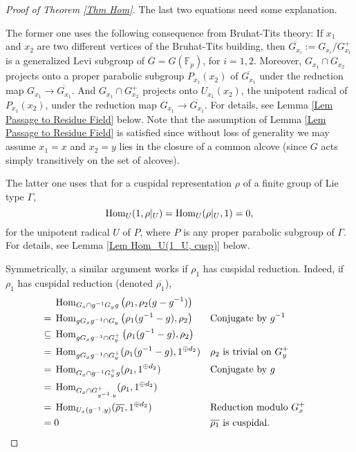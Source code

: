 \begin{proof}[Proof of Theorem \ref{Thm Hom}]
		The last two equations need some explanation. 
		
		The former one uses the following consequence from Bruhat-Tits theory: If $x_1$ and $x_2$ are two different vertices of the Bruhat-Tits building, then $\overline{G_{x_i}}:=G_{x_i}/G_{x_i}^+$ is a generalized Levi subgroup of $\overline{G}=G(\mathbb{F}_p)$, for $i=1, 2$. Moreover, $G_{x_1} \cap G_{x_2}$ projects onto a proper parabolic subgroup $P_{x_1}(x_2)$ of $\overline{G_{x_1}}$ under the reduction map $G_{x_1} \to \overline{G_{x_1}}$. And $G_{x_1} \cap G_{x_2}^+$ projects onto $U_{x_1}(x_2)$, the unipotent radical of $P_{x_1}(x_2)$, under the reduction map $G_{x_1} \to \overline{G_{x_1}}$. For details, see Lemma \ref{Lem Passage to Residue Field} below. Note that the assumption of Lemma \ref{Lem Passage to Residue Field} is satisfied since without loss of generality we may assume $x_1=x$ and $x_2=y$ lies in the closure of a common alcove (since $G$ acts simply transitively on the set of alcoves).
		
		The latter one uses that for a cuspidal representation $\rho$ of a finite group of Lie type $\Gamma$, 
		$$\operatorname{\operatorname{Hom}}_U(1, \rho|_U)=\operatorname{\operatorname{Hom}}_U(\rho|_U, 1)=0,$$
		for the unipotent radical $U$ of $P$, where $P$ is any proper parabolic subgroup of $\Gamma$. For details, see Lemma \ref{Lem Hom_U(1_U, cusp)} below.
		
		Symmetrically, a similar argument works if $\rho_1$ has cuspidal reduction. Indeed, if $\rho_1$ has cuspidal reduction (denoted $\overline{\rho_1}$),
		\begin{align*}    	
			& \Hom_{G_x \cap g^{-1}G_yg}\left(\rho_1, \rho_2(g-g^{-1})\right) \\
			=\;& \Hom_{gG_xg^{-1} \cap G_y}\left(\rho_1(g^{-1}-g), \rho_2\right) && \text{Conjugate by $g^{-1}$}\\ 
			\subseteq\;& \Hom_{gG_xg^{-1} \cap G_y^+}\left(\rho_1(g^{-1}-g), \rho_2\right) && %
			\\
			=\;& \Hom_{gG_xg^{-1} \cap G_y^+}(\rho_1(g^{-1}-g), 1^{\oplus d_2}) && \text{$\rho_2$ is trivial on $G_y^+$ }\\
			=\;& \Hom_{G_x \cap g^{-1}G_y^+g}(\rho_1, 1^{\oplus d_2}) && \text{Conjugate by $g$}\\
			=\;& \Hom_{G_x \cap G_{g^{-1}.y}^+}(\rho_1, 1^{\oplus d_2}) && \\
			=\;& \Hom_{U_x(g^{-1}.y)}(\overline{\rho_1}, 1^{\oplus d_2}) && \text{Reduction modulo $G_x^+$}\\
			=\;& 0 && \text{$\overline{\rho_1}$ is cuspidal. }
		\end{align*}
		
	\end{proof}
	
